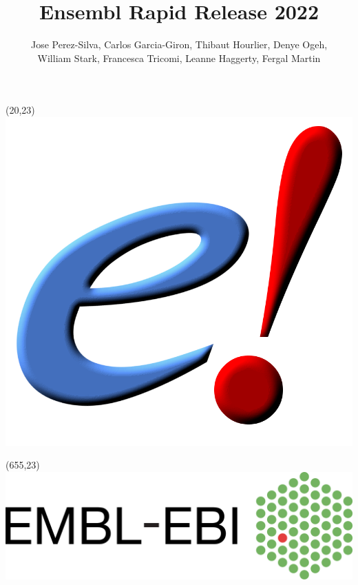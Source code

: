 \documentclass[final]{beamer}
\title{\textcolor{mitred}{Ensembl Rapid Release 2022}}
\author{Jose Perez-Silva, Carlos Garcia-Giron, Thibaut Hourlier, Denye Ogeh, \\William Stark, Francesca Tricomi, Leanne Haggerty, Fergal Martin}
\institute[shortinst]{\inst{} Genebuild Team, Ensembl, EMBL-EBI, Hinxton, UK.}
\begin{document}
\begin{textblock}{20}(20,23)
    \sloppy
    \includegraphics[scale=1]{figures/ensembl-logo}
\end{textblock}

\begin{textblock}{20}(655,23)
    \sloppy
    \includegraphics[scale=0.57]{figures/embl-ebi}
\end{textblock}

\end{document}

